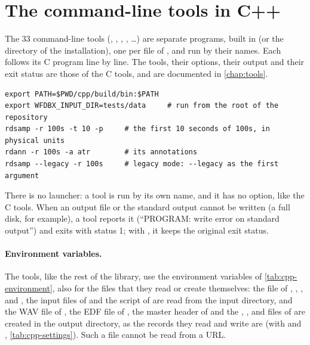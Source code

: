 \section{The command-line tools in C++}
\label{sec:cpp-tools}

The 33 command-line tools (, , , ,
\ldots) are separate programs, built in  (or the  directory
of the installation), one per file of , and run by their names. Each
follows its C program line by line. The tools, their options, their output and their exit
status are those of the C tools, and are documented in \cref{chap:tools}.

\begin{lstlisting}[style=shell]
export PATH=$PWD/cpp/build/bin:$PATH
export WFDBX_INPUT_DIR=tests/data     # run from the root of the repository
rdsamp -r 100s -t 10 -p     # the first 10 seconds of 100s, in physical units
rdann -r 100s -a atr        # its annotations
rdsamp --legacy -r 100s     # legacy mode: --legacy as the first argument
\end{lstlisting}

There is no launcher: a tool is run by its own name, and it has no 
option, like the C tools. When an output file or the standard output cannot be written (a
full disk, for example), a tool reports it (``PROGRAM: write error on standard output'')
and exits with status 1; with , it keeps the original exit status.

\paragraph{Environment variables.} The tools, like the rest of the library, use the
environment variables of \cref{tab:cpp-environment}, also for the files that they read or
create themselves: the  file of , , ,
 and , the input files of  and the  script
of  are read from the input directory, and the WAV file of ,
the EDF file of , the master header of  and the ,
,  and  files of  are created in the
output directory, as the records they read and write are (with
 and , \cref{tab:cpp-settings}). Such
a file cannot be read from a URL.

